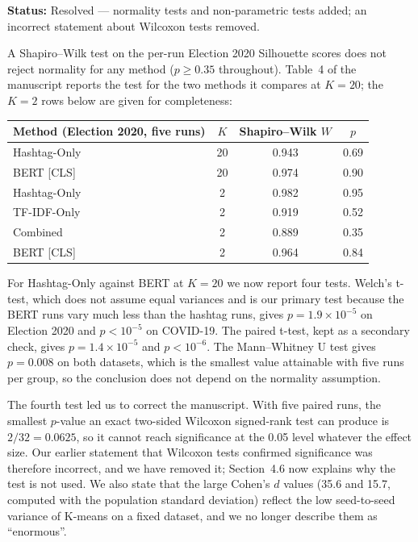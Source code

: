 \documentclass[11pt,a4paper]{article}
\newcommand{\status}[1]{\textbf{\color{statusgreen}Status:} #1}
\begin{document}
\status{Resolved --- normality tests and non-parametric tests added; an incorrect statement about Wilcoxon tests removed.}

A Shapiro--Wilk test on the per-run Election 2020 Silhouette scores does not reject normality for any method ($p \geq 0.35$ throughout). Table~4 of the manuscript reports the test for the two methods it compares at $K = 20$; the $K = 2$ rows below are given for completeness:

\begin{center}
\small
\begin{tabular}{lccc}
\toprule
Method (Election 2020, five runs) & $K$ & Shapiro--Wilk $W$ & $p$ \\
\midrule
Hashtag-Only & 20 & 0.943 & 0.69 \\
BERT [CLS]   & 20 & 0.974 & 0.90 \\
Hashtag-Only & 2  & 0.982 & 0.95 \\
TF-IDF-Only  & 2  & 0.919 & 0.52 \\
Combined     & 2  & 0.889 & 0.35 \\
BERT [CLS]   & 2  & 0.964 & 0.84 \\
\bottomrule
\end{tabular}
\end{center}

For Hashtag-Only against BERT at $K = 20$ we now report four tests. Welch's t-test, which does not assume equal variances and is our primary test because the BERT runs vary much less than the hashtag runs, gives $p = 1.9 \times 10^{-5}$ on Election 2020 and $p < 10^{-5}$ on COVID-19. The paired t-test, kept as a secondary check, gives $p = 1.4 \times 10^{-5}$ and $p < 10^{-6}$. The Mann--Whitney U test gives $p = 0.008$ on both datasets, which is the smallest value attainable with five runs per group, so the conclusion does not depend on the normality assumption.

The fourth test led us to correct the manuscript. With five paired runs, the smallest $p$-value an exact two-sided Wilcoxon signed-rank test can produce is $2/32 = 0.0625$, so it cannot reach significance at the 0.05 level whatever the effect size. Our earlier statement that Wilcoxon tests confirmed significance was therefore incorrect, and we have removed it; Section~4.6 now explains why the test is not used. We also state that the large Cohen's $d$ values (35.6 and 15.7, computed with the population standard deviation) reflect the low seed-to-seed variance of K-means on a fixed dataset, and we no longer describe them as ``enormous''.
\end{document}
